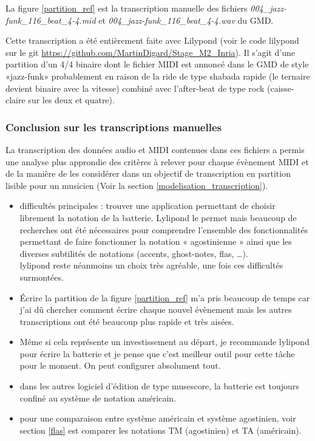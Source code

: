 La figure \ref{partition_ref} est la transcription manuelle des fichiers
\textit{004\_jazz-funk\_116\_beat\_4-4.mid} et
\textit{004\_jazz-funk\_116\_beat\_4-4.wav} du GMD.

Cette transcription a été entièrement faite avec Lilypond (voir le code
lilypond sur le git \url{https://github.com/MartinDigard/Stage_M2_Inria}). Il
s’agit d’une partition d’un 4/4 binaire dont le fichier MIDI est annoncé dans
le GMD de style «jazz-funk» probablement en raison de la ride de type shabada
rapide (le ternaire devient binaire avec la vitesse) combiné avec l’after-beat
de type rock (caisse-claire sur les deux et quatre).

\subsubsection{Conclusion sur les transcriptions manuelles}
La transcription des données audio et MIDI contenues dans ces fichiers a permis
une analyse plus approndie des critères à relever pour chaque évènement MIDI et
de la manière de les considérer dans un objectif de transcription en partition
lisible pour un musicien (Voir la section \ref{modelisation_transcription}).

\begin{itemize}
    \item difficultés principales : trouver une application permettant de
        choisir librement la notation de la batterie. Lylipond le permet mais
        beaucoup de recherches ont été nécessaires pour comprendre l’ensemble
        des fonctionnalités permettant de faire fonctionner la notation
        « agostinienne » ainsi que les diverses subtilités de notations
        (accents, ghost-notes, flas, …).\\
        lylipond reste néanmoins un choix très agréable, une fois ces
        difficultés surmontées.
    \item Écrire la partition de la figure \ref{partition_ref} m’a pris
        beaucoup de temps car j’ai dû chercher comment écrire chaque nouvel
        évènement mais les autres transcriptions ont été beaucoup plus rapide
        et très aisées.
    \item Même si cela représente un investissement au départ, je recommande
        lylipond pour écrire la batterie et je pense que c’est meilleur outil
        pour cette tâche pour le moment. On peut configurer absolument tout.
    \item dans les autres logiciel d’édition de type musescore, la batterie
        est toujours confiné au système de notation américain.
    \item pour une comparaison entre système américain et système agostinien,
        voir section \ref{flas} est comparer les notations TM (agostinien) et
        TA (américain).
\end{itemize}


